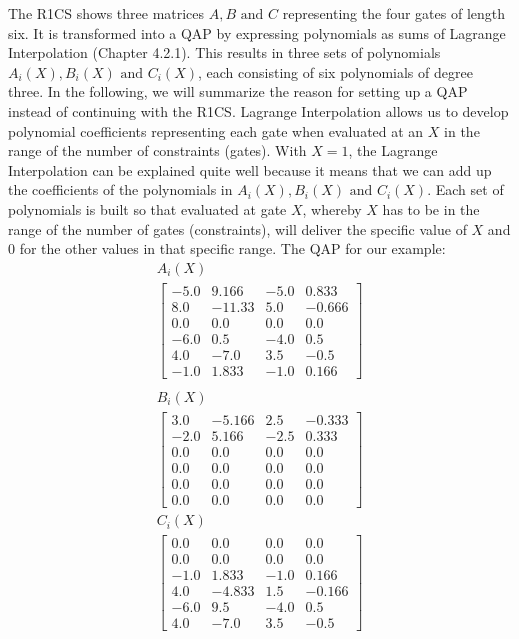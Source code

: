 The R1CS shows three matrices \(A, B \text{ and }C\) representing the four gates of length six. It is transformed into a QAP by expressing polynomials as sums of Lagrange Interpolation (Chapter 4.2.1). This results in three sets of polynomials \(A_i(X), B_i(X) \text{ and }C_i(X)\), each consisting of six polynomials of degree three. In the following, we will summarize the reason for setting up a QAP instead of continuing with the R1CS. Lagrange Interpolation allows us to develop polynomial coefficients representing each gate when evaluated at an \(X\) in the range of the number of constraints (gates). With \(X = 1\), the Lagrange Interpolation can be explained quite well because it means that we can add up the coefficients of the polynomials in \(A_i(X), B_i(X) \text{ and }C_i(X)\). Each set of polynomials is built so that evaluated at gate \(X\), whereby \(X\) has to be in the range of the number of gates (constraints), will deliver the specific value of \(X\) and 0 for the other values in that specific range.\newline
The QAP for our example:
\begin{align*}
    A_i(X) \\
    \begin{bmatrix}
        -5.0 & 9.166 & -5.0 & 0.833 \\
        8.0 & -11.33 & 5.0 & -0.666 \\
        0.0 & 0.0 & 0.0 & 0.0 \\
        -6.0 & 0.5 & -4.0 & 0.5 \\
        4.0 & -7.0 & 3.5 & -0.5 \\
        -1.0 & 1.833 & -1.0 & 0.166
    \end{bmatrix} \\
\end{align*}
\begin{align*}
        B_i(X) \\
    \begin{bmatrix}
        3.0 & -5.166 & 2.5 & -0.333 \\
        -2.0 & 5.166 & -2.5 & 0.333 \\
        0.0 & 0.0 & 0.0 & 0.0 \\
        0.0 & 0.0 & 0.0 & 0.0 \\
        0.0 & 0.0 & 0.0 & 0.0 \\
        0.0 & 0.0 & 0.0 & 0.0
    \end{bmatrix}
\end{align*}
\begin{align*}
        C_i(X) \\
    \begin{bmatrix}
        0.0 & 0.0 & 0.0 & 0.0 \\
        0.0 & 0.0 & 0.0 & 0.0 \\
        -1.0 & 1.833 & -1.0 & 0.166 \\
        4.0 & -4.833 & 1.5 & -0.166 \\
        -6.0 & 9.5 & -4.0 & 0.5 \\
        4.0 & -7.0 & 3.5 & -0.5
    \end{bmatrix}
\end{align*}
